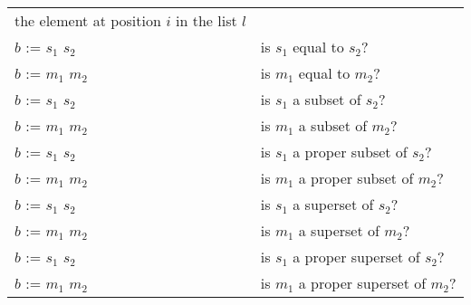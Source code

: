 \begin{supertabular}{lp{0.7\textwidth}}
the element at position $i$ in the list $l$
\\
$b$ := $s_1$ \ai[\tt]{=} $s_2$ & is $s_1$ equal to $s_2$?
\\
$b$ := $m_1$ \ai[\tt]{=} $m_2$ & is $m_1$ equal to $m_2$?
\\
$b$ := $s_1$ \ai[\tt]{<=} $s_2$ & is $s_1$ a subset of $s_2$?
\\
$b$ := $m_1$ \ai[\tt]{<=} $m_2$ & is $m_1$ a subset of $m_2$?
\\
$b$ := $s_1$ \ai[\tt]{<} $s_2$ & is $s_1$ a proper subset of $s_2$?
\\
$b$ := $m_1$ \ai[\tt]{<} $m_2$ & is $m_1$ a proper subset of $m_2$?
\\
$b$ := $s_1$ \ai[\tt]{>=} $s_2$ & is $s_1$ a superset of $s_2$?
\\
$b$ := $m_1$ \ai[\tt]{>=} $m_2$ & is $m_1$ a superset of $m_2$?
\\
$b$ := $s_1$ \ai[\tt]{>} $s_2$ & is $s_1$ a proper superset of $s_2$?
\\
$b$ := $m_1$ \ai[\tt]{>} $m_2$ & is $m_1$ a proper superset of $m_2$?
\\
\end{supertabular}
